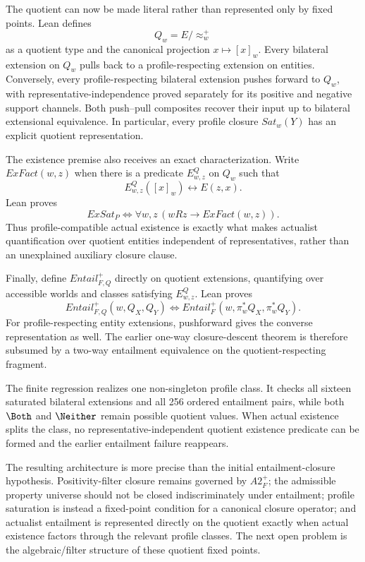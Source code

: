 The quotient can now be made literal rather than represented only by fixed points. Lean defines
\[
  Q_w=E/{\approx_w^+}
\]
as a quotient type and the canonical projection \(x\mapsto[x]_w\). Every bilateral extension on \(Q_w\) pulls back to a profile-respecting extension on entities. Conversely, every profile-respecting bilateral extension pushes forward to \(Q_w\), with representative-independence proved separately for its positive and negative support channels. Both push--pull composites recover their input up to bilateral extensional equivalence. In particular, every profile closure \(Sat_w(Y)\) has an explicit quotient representation.

The existence premise also receives an exact characterization. Write \(ExFact(w,z)\) when there is a predicate \(E^Q_{w,z}\) on \(Q_w\) such that
\[
  E^Q_{w,z}([x]_w)\leftrightarrow E(z,x).
\]
Lean proves
\[
\boxed{
  ExSat_P
  \Longleftrightarrow
  \forall w,z\,(wRz\rightarrow ExFact(w,z)).
}
\]
Thus profile-compatible actual existence is exactly what makes actualist quantification over quotient entities independent of representatives, rather than an unexplained auxiliary closure clause.

Finally, define \(Entail_{F,Q}^+\) directly on quotient extensions, quantifying over accessible worlds and classes satisfying \(E^Q_{w,z}\). Lean proves
\[
\boxed{
  Entail_{F,Q}^+(w,Q_X,Q_Y)
  \Longleftrightarrow
  Entail_F^+(w,\pi_w^*Q_X,\pi_w^*Q_Y).
}
\]
For profile-respecting entity extensions, pushforward gives the converse representation as well. The earlier one-way closure-descent theorem is therefore subsumed by a two-way entailment equivalence on the quotient-respecting fragment.

The finite regression realizes one non-singleton profile class. It checks all sixteen saturated bilateral extensions and all 256 ordered entailment pairs, while both \(\Both\) and \(\Neither\) remain possible quotient values. When actual existence splits the class, no representative-independent quotient existence predicate can be formed and the earlier entailment failure reappears.

The resulting architecture is more precise than the initial entailment-closure hypothesis. Positivity-filter closure remains governed by \(A2_F^+\); the admissible property universe should not be closed indiscriminately under entailment; profile saturation is instead a fixed-point condition for a canonical closure operator; and actualist entailment is represented directly on the quotient exactly when actual existence factors through the relevant profile classes. The next open problem is the algebraic/filter structure of these quotient fixed points.

